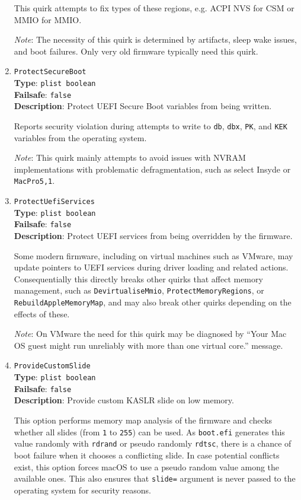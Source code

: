\documentclass[]{article}
\begin{document}
\begin{enumerate}
  This quirk attempts to fix types of these regions, e.g. ACPI NVS for
  CSM or MMIO for MMIO.

  \emph{Note}: The necessity of this quirk is determined by artifacts, sleep
  wake issues, and boot failures. Only very old firmware typically need
  this quirk.

\item
  \texttt{ProtectSecureBoot}\\
  \textbf{Type}: \texttt{plist\ boolean}\\
  \textbf{Failsafe}: \texttt{false}\\
  \textbf{Description}: Protect UEFI Secure Boot variables from being written.

  Reports security violation during attempts to write to \texttt{db}, \texttt{dbx},
  \texttt{PK}, and \texttt{KEK} variables from the operating system.

  \emph{Note}: This quirk mainly attempts to avoid issues with NVRAM implementations
  with problematic defragmentation, such as select Insyde or \texttt{MacPro5,1}.

\item
  \texttt{ProtectUefiServices}\\
  \textbf{Type}: \texttt{plist\ boolean}\\
  \textbf{Failsafe}: \texttt{false}\\
  \textbf{Description}: Protect UEFI services from being overridden by the firmware.

  Some modern firmware, including on virtual machines such as VMware,
  may update pointers to UEFI services during driver loading and related actions.
  Consequentially this directly breaks other quirks that affect memory management,
  such as \texttt{DevirtualiseMmio}, \texttt{ProtectMemoryRegions}, or \texttt{RebuildAppleMemoryMap},
  and may also break other quirks depending on the effects of these.

  \emph{Note}: On VMware the need for this quirk may be diagnosed by ``Your Mac OS guest
  might run unreliably with more than one virtual core.'' message.

\item
  \texttt{ProvideCustomSlide}\\
  \textbf{Type}: \texttt{plist\ boolean}\\
  \textbf{Failsafe}: \texttt{false}\\
  \textbf{Description}: Provide custom KASLR slide on low memory.

  This option performs memory map analysis of the firmware and checks whether
  all slides (from \texttt{1} to \texttt{255}) can be used. As \texttt{boot.efi}
  generates this value randomly with \texttt{rdrand} or pseudo randomly \texttt{rdtsc},
  there is a chance of boot failure when it chooses a conflicting slide. In case
  potential conflicts exist, this option forces macOS to use a pseudo random value
  among the available ones. This also ensures that \texttt{slide=} argument is never
  passed to the operating system for security reasons.


\end{enumerate}
\end{document}
